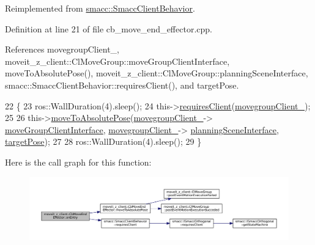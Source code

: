 Reimplemented from \hyperlink{classsmacc_1_1SmaccClientBehavior_a7962382f93987c720ad432fef55b123f}{smacc\+::\+Smacc\+Client\+Behavior}.



Definition at line 21 of file cb\+\_\+move\+\_\+end\+\_\+effector.\+cpp.



References movegroup\+Client\+\_\+, moveit\+\_\+z\+\_\+client\+::\+Cl\+Move\+Group\+::move\+Group\+Client\+Interface, move\+To\+Absolute\+Pose(), moveit\+\_\+z\+\_\+client\+::\+Cl\+Move\+Group\+::planning\+Scene\+Interface, smacc\+::\+Smacc\+Client\+Behavior\+::requires\+Client(), and target\+Pose.


\begin{DoxyCode}
22 \{
23     ros::WallDuration(4).sleep();
24     this->\hyperlink{classsmacc_1_1SmaccClientBehavior_a917f001e763a1059af337bf4e164f542}{requiresClient}(\hyperlink{classmoveit__z__client_1_1CbMoveEndEffector_af62a434c16849885a085e30b8ae70e00}{movegroupClient\_});
25 
26     this->\hyperlink{classmoveit__z__client_1_1CbMoveEndEffector_a4b77954562c23ba6d0aa0f9c805dfd8d}{moveToAbsolutePose}(\hyperlink{classmoveit__z__client_1_1CbMoveEndEffector_af62a434c16849885a085e30b8ae70e00}{movegroupClient\_}->
      \hyperlink{classmoveit__z__client_1_1ClMoveGroup_af86e046b837be0ef4afa9893d8808f20}{moveGroupClientInterface}, \hyperlink{classmoveit__z__client_1_1CbMoveEndEffector_af62a434c16849885a085e30b8ae70e00}{movegroupClient\_}->
      \hyperlink{classmoveit__z__client_1_1ClMoveGroup_a21c879b2683286aa21ce68f40195b4b5}{planningSceneInterface}, \hyperlink{classmoveit__z__client_1_1CbMoveEndEffector_abea9c6077733077baced34c6098c6140}{targetPose});
27 
28     ros::WallDuration(4).sleep();
29 \}
\end{DoxyCode}
Here is the call graph for this function\+:
\nopagebreak
\begin{figure}[H]
\begin{center}
\leavevmode
\includegraphics[width=350pt]{classmoveit__z__client_1_1CbMoveEndEffector_a5306018b432c9d8f8a31823f6b317d84_cgraph}
\end{center}
\end{figure}
\mbox{\label{classmoveit__z__client_1_1CbMoveEndEffector_af3fdc6c596da7792cfc9bbef13cb02fc}} 
